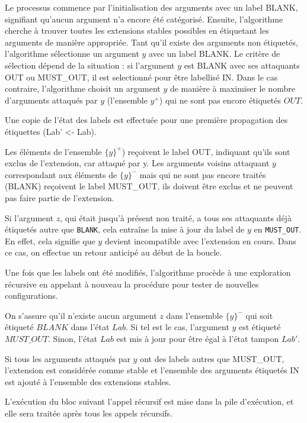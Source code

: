 \documentclass{rapportECL}
\begin{document}
\begin{itemize}
Le processus commence par l'initialisation des arguments avec un label  {BLANK}, signifiant qu'aucun argument n'a encore été catégorisé. 
Ensuite, l'algorithme cherche à trouver toutes les extensions stables possibles en étiquetant les arguments de manière appropriée. 
Tant qu'il existe des arguments non étiquetés, l'algorithme sélectionne un argument \( y \) avec un label  {BLANK}. 
Le critère de sélection dépend de la situation : si l'argument \( y \)  est {BLANK} avec ses attaquants  {OUT} ou {MUST\_OUT}, il est selectionné pour être labellisé {IN}. 
Dans le cas contraire, l'algorithme choisit un argument \( y \) de manière à maximiser le nombre d'arguments attaqués par \( y \) (l'ensemble \( {y}^+ \)) qui ne sont pas encore étiquetés \( {OUT} \).


Une copie  de l'état des labels est effectuée pour une première propagation des étiquettes (Lab' <- Lab).


Les éléments de l'ensemble \( \{y\}^+ \)) reçoivent le label  {OUT}, indiquant qu'ils sont exclus de l'extension, car attaqué par y. 
Les arguments voisins attaquant \( y \) correspondant aux éléments de \( \{y\}^- \) mais qui ne sont pas encore traités ({BLANK}) reçoivent le label {MUST\_OUT}, ils doivent être exclus et ne peuvent pas faire partie de l'extension. 

Si l'argument \( z \), qui était jusqu'à présent non traité, a tous ses attaquants déjà étiquetés autre que \texttt{BLANK}, 
cela entraîne la mise à jour du label de \( y \) en \texttt{MUST\_OUT}. En effet, cela signifie que \( y \) devient incompatible 
avec l'extension en cours. Dans ce cas, on effectue un retour anticipé au début de la boucle.


Une fois que les labels ont été modifiés, l'algorithme procède à une exploration récursive en appelant à nouveau la procédure pour tester de nouvelles configurations. 

On s'assure qu'il n'existe aucun argument \( z \) dans l'ensemble \( \{y\}^- \) qui soit étiqueté \(  {BLANK} \) dans l'état \( Lab \). Si tel est le cas, l'argument \( y \) est étiqueté \(  {MUST\_OUT} \). Sinon, l'état \( Lab \) est mis à jour pour être égal à l'état tampon \( Lab' \).

Si tous les arguments attaqués par \( y \) ont des labels autres que  { MUST\_OUT}, l'extension est considérée comme stable et l'ensemble des arguments étiquetés  {IN} est ajouté à l'ensemble des extensions stables.

L'exécution du bloc suivant l'appel récursif est mise dans la pile d'exécution, et elle sera traitée après tous les appels récursifs.


\end{itemize}
\end{document}
